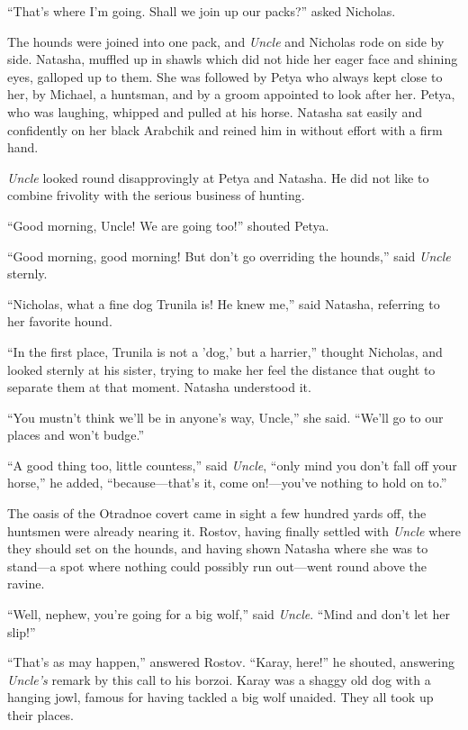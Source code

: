 ``That's where I'm going. Shall we join up our packs?'' asked
Nicholas.

The hounds were joined into one pack, and \emph{Uncle} and
Nicholas rode on side by side. Natasha, muffled up in shawls
which did not hide her eager face and shining eyes, galloped up
to them. She was followed by Petya who always kept close to her,
by Michael, a huntsman, and by a groom appointed to look after
her. Petya, who was laughing, whipped and pulled at his
horse. Natasha sat easily and confidently on her black Arabchik
and reined him in without effort with a firm hand.

\emph{Uncle} looked round disapprovingly at Petya and Natasha. He
did not like to combine frivolity with the serious business of
hunting.

``Good morning, Uncle! We are going too!'' shouted Petya.

``Good morning, good morning! But don't go overriding the
hounds,'' said \emph{Uncle} sternly.

``Nicholas, what a fine dog Trunila is! He knew me,'' said
Natasha, referring to her favorite hound.

``In the first place, Trunila is not a 'dog,' but a harrier,''
thought Nicholas, and looked sternly at his sister, trying to
make her feel the distance that ought to separate them at that
moment. Natasha understood it.

``You mustn't think we'll be in anyone's way, Uncle,'' she
said. ``We'll go to our places and won't budge.''

``A good thing too, little countess,'' said \emph{Uncle}, ``only
mind you don't fall off your horse,'' he added,
``because---that's it, come on!---you've nothing to hold on to.''

The oasis of the Otradnoe covert came in sight a few hundred
yards off, the huntsmen were already nearing it. Rostov, having
finally settled with \emph{Uncle} where they should set on the
hounds, and having shown Natasha where she was to stand---a spot
where nothing could possibly run out---went round above the
ravine.

``Well, nephew, you're going for a big wolf,'' said \emph{Uncle}.
``Mind and don't let her slip!''

``That's as may happen,'' answered Rostov. ``Karay, here!'' he
shouted, answering \emph{Uncle's} remark by this call to his
borzoi. Karay was a shaggy old dog with a hanging jowl, famous
for having tackled a big wolf unaided. They all took up their
places.

